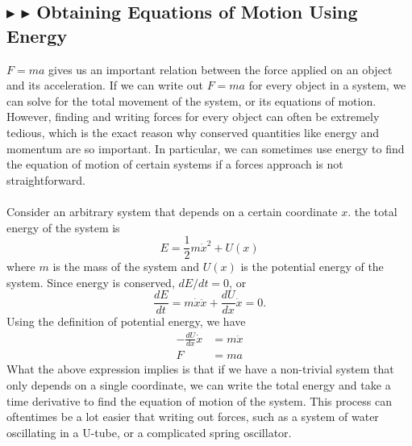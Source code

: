 %
%
\subsection{\color{Goldenrod} $\blacktriangleright$ \color{Orchid} $\blacktriangleright$ \color{black} Obtaining Equations of Motion Using Energy}
$F=ma$ gives us an important relation between the force applied on an object and its acceleration. If we can write out $F=ma$ for every object in a system, we can solve for the total movement of the system, or its equations of motion. However, finding and writing forces for every object can often be extremely tedious, which is the exact reason why conserved quantities like energy and momentum are so important. In particular, we can sometimes use energy to find the equation of motion of certain systems if a forces approach is not straightforward. \\
\\
\noindent Consider an arbitrary system that depends on a certain coordinate $x$. the total energy of the system is
\begin{equation}
    E = \frac12 m\dot{x}^2 + U(x)
\end{equation}
\noindent where $m$ is the mass of the system and $U(x)$ is the potential energy of the system. Since energy is conserved, $dE/dt = 0$, or 
\begin{equation*}
    \frac{dE}{dt} = m\dot{x}\ddot{x} + \frac{dU}{dx}\dot{x} = 0.
\end{equation*}
\noindent Using the definition of potential energy, we have
\begin{align*}
    -\frac{dU}{dx}\dot{x} &= m\ddot{x} \\
    F &= ma
\end{align*}
\noindent What the above expression implies is that if we have a non-trivial system that only depends on a single coordinate, we can write the total energy and take a time derivative to find the equation of motion of the system. This process can oftentimes be a lot easier that writing out forces, such as a system of water oscillating in a U-tube, or a complicated spring oscillator.

\clearpage

%
%
%
%

